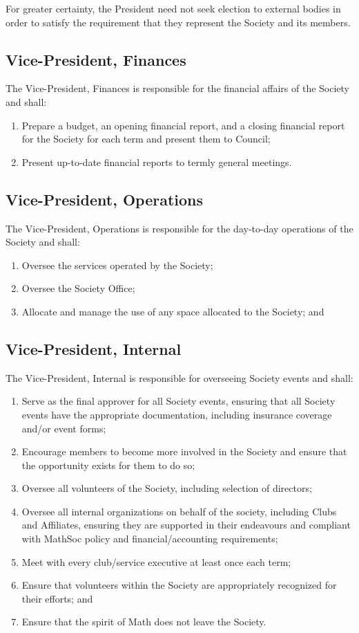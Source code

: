 For greater certainty, the President need not seek election to external bodies
in order to satisfy the requirement that they represent the Society and its
members.

\subsection{Vice-President, Finances}
The Vice-President, Finances is responsible for the financial affairs of the
Society and shall:
\begin{enumerate}
  \item Prepare a budget, an opening financial report, and a closing financial
    report for the Society for each term and present them to Council;
  \item Present up-to-date financial reports to termly general meetings.
\end{enumerate}

\subsection{Vice-President, Operations}
The Vice-President, Operations is responsible for the day-to-day operations of
the Society and shall:
\begin{enumerate}
  \item Oversee the services operated by the Society;
  \item Oversee the Society Office;
  \item Allocate and manage the use of any space allocated to the Society; and
\end{enumerate}

\subsection{Vice-President, Internal}
The Vice-President, Internal is responsible for overseeing Society events and
shall:
\begin{enumerate}
  \item Serve as the final approver for all Society events, ensuring that all
      Society events have the appropriate documentation, including insurance
      coverage and/or event forms;
  \item Encourage members to become more involved in the Society and ensure
      that the opportunity exists for them to do so;
  \item Oversee all volunteers of the Society, including selection of
      directors;
  \item Oversee all internal organizations on behalf of the society, including
      Clubs and Affiliates, ensuring they are supported in their endeavours and
      compliant with MathSoc policy and financial/accounting requirements;
  \item Meet with every club/service executive at least once each term;
  \item Ensure that volunteers within the Society are appropriately recognized
      for their efforts; and
  \item Ensure that the spirit of Math does not leave the Society.
\end{enumerate}

